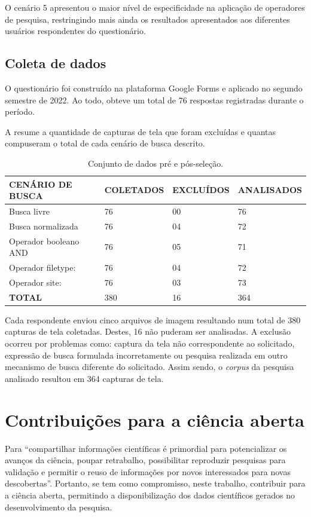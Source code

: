 \documentclass[portuguese]{textolivre}
\begin{document}
O cenário 5 apresentou o maior nível de especificidade na aplicação de operadores de pesquisa, restringindo mais ainda os resultados apresentados aos diferentes usuários respondentes do questionário.

\subsection{Coleta de dados}\label{sec-organizacao-latex}
O questionário foi construído na plataforma Google Forms e aplicado no segundo semestre de 2022. Ao todo, obteve um total de 76 respostas registradas durante o período.

A  resume a quantidade de capturas de tela que foram excluídas e quantas compuseram o total de cada cenário de busca descrito.

\begin{table}[h!]
\centering
\begin{threeparttable}
\caption{Conjunto de dados pré e pós-seleção.}
\label{tab02}
\begin{tabular}{l l l l}
\toprule
 \textbf{CENÁRIO DE BUSCA} & \textbf{COLETADOS} & \textbf{EXCLUÍDOS} & \textbf{ANALISADOS} \\
 \midrule
Busca livre & 76 & 00 & 76 \\
Busca normalizada & 76 & 04 & 72 \\
Operador booleano AND & 76 & 05 & 71 \\
Operador filetype: & 76 & 04 & 72 \\
Operador site: & 76 & 03 & 73 \\
\textbf{TOTAL} & 380 & 16 & 364 \\
\bottomrule
\end{tabular}
\end{threeparttable}
\end{table}

Cada respondente enviou cinco arquivos de imagem resultando num total de 380 capturas de tela coletadas. Destes, 16 não puderam ser analisadas. A exclusão ocorreu por problemas como: captura da tela não correspondente ao solicitado, expressão de busca formulada incorretamente ou pesquisa realizada em outro mecanismo de busca diferente do solicitado. Assim sendo, o \textit{corpus} da pesquisa analisado resultou em 364 capturas de tela.

\section{Contribuições para a ciência aberta}\label{sec-titulo}
Para \textcite[p. 17]{lecardelli_dados_2020} “compartilhar informações científicas é primordial para potencializar os avanços da ciência, poupar retrabalho, possibilitar reproduzir pesquisas para validação e permitir o reuso de informações por novos interessados para novas descobertas”. Portanto, se tem como compromisso, neste trabalho, contribuir para a ciência aberta, permitindo a disponibilização dos dados científicos gerados no desenvolvimento da pesquisa.
\end{document}
